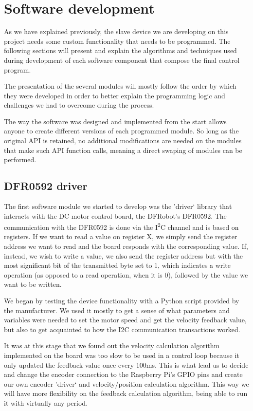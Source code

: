 \section{Software development} \label{sec:software-devel}
As we have explained previously, the slave device we are developing on this project needs some custom functionality that needs to be programmed.
The following sections will present and explain the algorithms and techniques used during development of each software component that compose the final control program.

The presentation of the several modules will mostly follow the order by which they were developed in order to better explain the programming logic and challenges we had to overcome during the process.

The way the software was designed and implemented from the start allows anyone to create different versions of each programmed module.
So long as the original API is retained, no additional modifications are needed on the modules that make such API function calls, meaning a direct swaping of modules can be performed.

\subsection{DFR0592 driver}
The first software module we started to develop was the 'driver` library that interacts with the DC motor control board, the DFRobot's DFR0592.
The communication with the DFR0592 is done via the I\textsuperscript{2}C channel and is based on registers.
If we want to read a value on register X, we simply send the register address we want to read and the board responds with the corresponding value.
If, instead, we wish to write a value, we also send the register address but with the most significant bit of the transmitted byte set to 1, which indicates a write operation (as opposed to a read operation, when it is 0), followed by the value we want to be written.

We began by testing the device functionality with a Python \cite{sw:python} script provided by the manufacturer.
We used it mostly to get a sense of what parameters and variables were needed to set the motor speed and get the velocity feedback value, but also to get acquainted to how the I2C communication transactions worked.

It was at this stage that we found out the velocity calculation algorithm implemented on the board was too slow to be used in a control loop because it only updated the feedback value once every 100ms.
This is what lead us to decide and change the encoder connection to the Raspberry Pi's GPIO pins and create our own encoder 'driver` and velocity/position calculation algorithm.
This way we will have more flexibility on the feedback calculation algorithm, being able to run it with virtually any period.

